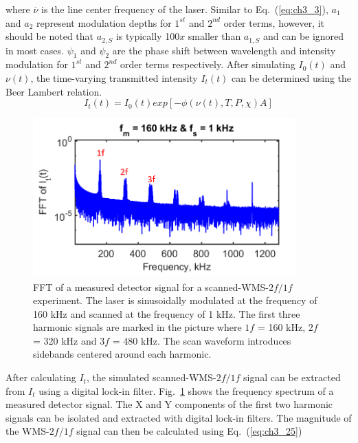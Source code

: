 \vspace{3mm}

\noindent where $\overline{\nu}$ is the line center frequency of the laser. Similar to Eq.\ (\ref{eq:ch3_3}), $a_1$ and $a_2$ represent modulation depths for $1^{st}$ and $2^{nd}$ order terms, however, it should be noted that $a_{2,S}$ is typically 100$x$ smaller than $a_{1,S}$ and can be ignored in most cases. $\psi_1$ and $\psi_2$ are the phase shift between wavelength and intensity modulation for $1^{st}$ and $2^{nd}$ order terms respectively. After simulating $I_0(t)$ and $\nu(t)$, the time-varying transmitted intensity $I_t(t)$ can be determined using the Beer Lambert relation.
\begin{equation}
I_t(t)=I_0(t)exp[-\phi(\nu(t),T,P,\chi)A]
\end{equation}


 \begin{figure}[h]
    \centering
        \includegraphics[trim = 0mm 0mm 0mm 0mm, clip=true, width=0.9\textwidth]{fig/ch3_fig5.png}
        \caption{FFT of a measured detector signal for a scanned-WMS-$2f/1f$ experiment. The laser is sinusoidally modulated at the frequency of 160 kHz and scanned at the frequency of 1 kHz. The first three harmonic signals are marked in the picture where $1f$ = 160 kHz, $2f$ = 320 kHz and $3f$ = 480 kHz. The scan waveform introduces sidebands centered around each harmonic.}
    \label{fig:ch3_3}
\end{figure}

After calculating $I_t$, the simulated scanned-WMS-$2f/1f$ signal can be extracted from $I_t$ using a digital lock-in filter. Fig.\ \ref{fig:ch3_3} shows the frequency spectrum of a measured detector signal. The X and Y components of the first two harmonic signals can be isolated and extracted with digital lock-in filters. The magnitude of the WMS-$2f/1f$ signal can then be calculated using Eq.\ (\ref{eq:ch3_25})


